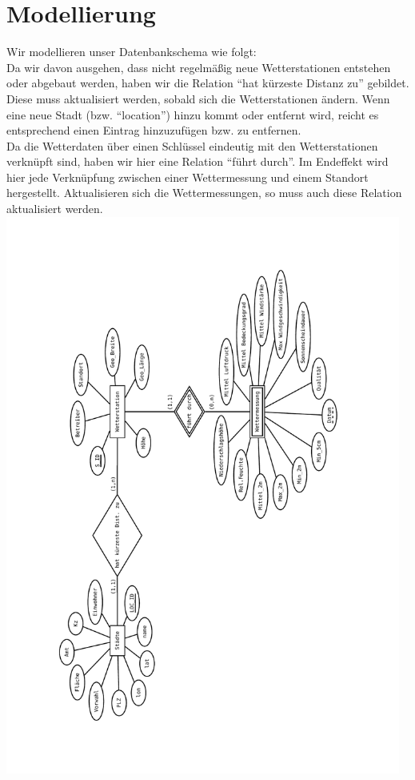 \documentclass[11pt,a4paper,DIV=10,]{scrartcl}
\begin{document}
\section{Modellierung}
Wir modellieren unser Datenbankschema wie folgt: \\
Da wir davon ausgehen, dass nicht regelmäßig neue Wetterstationen entstehen oder abgebaut werden, haben wir die Relation ``hat kürzeste Distanz zu'' gebildet. Diese muss aktualisiert werden, sobald sich die Wetterstationen ändern. Wenn eine neue Stadt (bzw. ``location'') hinzu kommt oder entfernt wird, reicht es entsprechend einen Eintrag hinzuzufügen bzw. zu entfernen. \\
Da die Wetterdaten über einen Schlüssel eindeutig mit den Wetterstationen verknüpft sind, haben wir hier eine Relation ``führt durch''. Im Endeffekt wird hier jede Verknüpfung zwischen einer Wettermessung und einem Standort hergestellt. Aktualisieren sich die Wettermessungen, so muss auch diese Relation aktualisiert werden. \\
\includegraphics[width=13cm, angle=270]{Diagram1.pdf}
\end{document}

